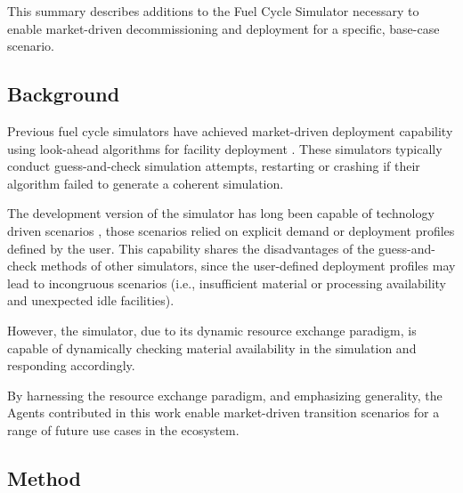 This summary describes additions to the \Cyclus Fuel Cycle Simulator necessary 
to enable market-driven decommissioning and deployment for a specific, 
base-case scenario.  



\subsection{Background}

Previous fuel cycle simulators have achieved market-driven deployment 
capability using look-ahead algorithms for facility deployment 
\cite{schneider_nfcsim:_2005,jacobson_user_2011}.  These simulators typically 
conduct guess-and-check simulation attempts, restarting or crashing if their 
algorithm failed to generate a coherent simulation.


The development version of the \Cyclus simulator has long been capable of 
technology driven scenarios \cite{gidden_once-through_2012}, those scenarios relied 
on explicit demand or deployment profiles defined by the user. This capability 
shares the disadvantages of the guess-and-check methods of other simulators, 
since the user-defined deployment profiles may lead to incongruous scenarios 
(i.e., insufficient material or processing availability and unexpected idle 
facilities).  

However, the \Cyclus simulator, due to its dynamic resource exchange paradigm, 
is capable of dynamically checking material availability in the simulation and 
responding accordingly.  


By harnessing the \Cyclus resource exchange paradigm, and emphasizing 
generality, the Agents contributed in this work enable market-driven transition 
scenarios for a range of future use cases in the \Cyclus ecosystem. 


\subsection{Method}


